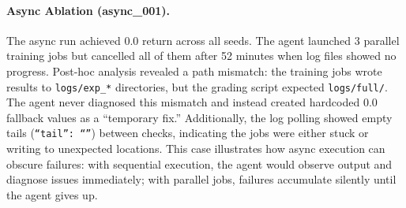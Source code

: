 \documentclass[11pt]{article}
\let\oldtexttt\texttt
\renewcommand{\texttt}[1]{{\fontseries{m}\selectfont\oldtexttt{#1}}}
\theoremstyle{plain}
\theoremstyle{definition}
\theoremstyle{remark}
\begin{document}
\paragraph{Async Ablation (async\_001).} The async run achieved 0.0 return across all seeds. The agent launched 3 parallel training jobs but cancelled all of them after 52 minutes when log files showed no progress. Post-hoc analysis revealed a path mismatch: the training jobs wrote results to \texttt{logs/exp\_*} directories, but the grading script expected \texttt{logs/full/}. The agent never diagnosed this mismatch and instead created hardcoded 0.0 fallback values as a ``temporary fix.'' Additionally, the log polling showed empty tails (\texttt{``tail'': ``''}) between checks, indicating the jobs were either stuck or writing to unexpected locations. This case illustrates how async execution can obscure failures: with sequential execution, the agent would observe output and diagnose issues immediately; with parallel jobs, failures accumulate silently until the agent gives up.
\end{document}
